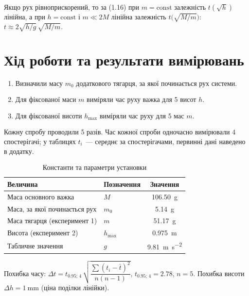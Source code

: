 \documentclass[ukrainian]{ucaphyslab}
\begin{document}
Якщо рух рівноприскорений, то за (1.16) при $m=\text{const}$ залежність $t(\sqrt h)$ лінійна,
а при $h=\text{const}$ і $m \ll 2M$ лінійна залежність $t\bigl(\sqrt{M/m}\bigr)$:
$t \approx 2\sqrt{h/g}\,\sqrt{M/m}$.

\section{Хід роботи та результати вимірювань}
\begin{enumerate}
  \item Визначили масу $m_0$ додаткового тягарця, за якої починається рух системи.
  \item Для фіксованої маси $m$ виміряли час руху важка для 5 висот $h$.
  \item Для фіксованої висоти $h_\text{max}$ виміряли час руху для 5 мас $m$.
\end{enumerate}
Кожну спробу проводили 5 разів. Час кожної спроби одночасно вимірювали 4 спостерігачі;
у таблицях $t_i$~— середнє за спостерігачами, первинні дані наведено в додатку.

\begin{table}[H]
  \centering
  \begin{tabular}{@{}llc@{}}
    \toprule
    Величина & Позначення & Значення \\
    \midrule
    Маса основного важка & $M$ & \SI{106.50}{\gram} \\
    Маса, за якої починається рух & $m_0$ & \SI{5.14}{\gram} \\
    Маса тягарця (експеримент 1) & $m$ & \SI{51.17}{\gram} \\
    Висота (експеримент 2) & $h_\text{max}$ & \SI{0.975}{\meter} \\
    Табличне значення & $g$ & \SI{9.81}{\meter\per\second\squared} \\
    \bottomrule
  \end{tabular}
  \caption{Константи та параметри установки}
\end{table}

Похибка часу: $\Delta t = t_{0.95;\,4}\,\sqrt{\dfrac{\sum(t_i-\bar t)^2}{n(n-1)}}$,
$t_{0.95;\,4}=2.78$, $n=5$. Похибка висоти $\Delta h = \SI{1}{\milli\meter}$ (ціна поділки лінійки).
\end{document}
